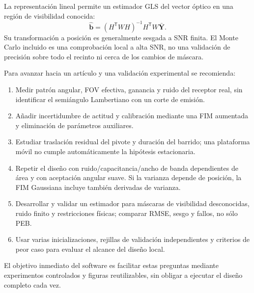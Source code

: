 \documentclass[11pt,a4paper]{article}
\begin{document}
La representación lineal permite un estimador GLS del vector óptico en una región de visibilidad conocida:
\begin{equation}
\hat{\mathbf b}=(H^{\mathsf T}WH)^{-1}H^{\mathsf T}W\bar{\mathbf Y}.
\end{equation}
Su transformación a posición es generalmente sesgada a SNR finita. El Monte Carlo incluido es una comprobación local a alta SNR, no una validación de precisión sobre todo el recinto ni cerca de los cambios de máscara.

Para avanzar hacia un artículo y una validación experimental se recomienda:
\begin{enumerate}
\item Medir patrón angular, FOV efectiva, ganancia y ruido del receptor real, sin identificar el semiángulo Lambertiano con un corte de emisión.
\item Añadir incertidumbre de actitud y calibración mediante una FIM aumentada y eliminación de parámetros auxiliares.
\item Estudiar traslación residual del pivote y duración del barrido; una plataforma móvil no cumple automáticamente la hipótesis estacionaria.
\item Repetir el diseño con ruido/capacitancia/ancho de banda dependientes de área y con aceptación angular suave. Si la varianza depende de posición, la FIM Gaussiana incluye también derivadas de varianza.
\item Desarrollar y validar un estimador para máscaras de visibilidad desconocidas, ruido finito y restricciones físicas; comparar RMSE, sesgo y fallos, no sólo PEB.
\item Usar varias inicializaciones, rejillas de validación independientes y criterios de peor caso para evaluar el alcance del diseño local.
\end{enumerate}
El objetivo inmediato del software es facilitar estas preguntas mediante experimentos controlados y figuras reutilizables, sin obligar a ejecutar el diseño completo cada vez.



\end{document}
